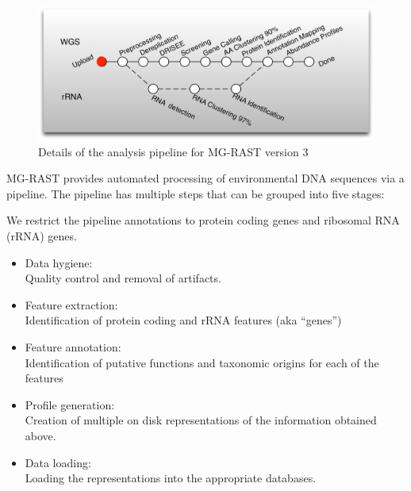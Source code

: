 \documentclass[12pt,fullpage]{report}
\begin{document}
\begin{figure}
\begin{center}
\includegraphics[width=6in]{Images/mgrastv3pipeline.png}
\end{center}
\caption{
Details of the analysis pipeline for MG-RAST version 3}
\label{fig:mgrast-v3-pipeline}
\end{figure}

MG-RAST provides automated processing of environmental DNA sequences via a pipeline. The pipeline has multiple steps that can be grouped into five stages:

We restrict the pipeline annotations to protein coding genes and ribosomal RNA (\gls{rRNA}) genes.

\begin{itemize}

\item Data hygiene:\\
Quality control and removal of artifacts.

\item Feature extraction:\\
Identification of protein coding and rRNA features (aka ``genes'')

\item Feature annotation:\\
Identification of putative functions and taxonomic origins for each of the features


\item Profile generation:\\
Creation of multiple on disk representations of the information obtained above.

\item Data loading:\\
Loading the representations into the appropriate databases.

\end{itemize}
\end{document}

